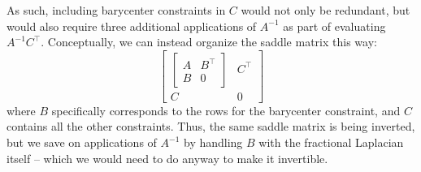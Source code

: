 \documentclass[11pt]{article}
\begin{document}
As such, including barycenter constraints in $C$ would not only be redundant, but would also require three additional applications of $A^{-1}$ as part of evaluating $A^{-1}C^{\top}$. Conceptually, we can instead organize the saddle matrix this way: 
$$
\left[
\begin{array}{cc}
\left[
\begin{array}{cc}
A & B^{\top} \\
B & 0
\end{array}\right] & C^{\top} \\
C & 0
\end{array}
\right]
$$
where $B$ specifically corresponds to the rows for the barycenter constraint, and $C$ contains all the other constraints. Thus, the same saddle matrix is being inverted, but we save on applications of $A^{-1}$ by handling $B$ with the fractional Laplacian itself -- which we would need to do anyway to make it invertible.
\end{document}
